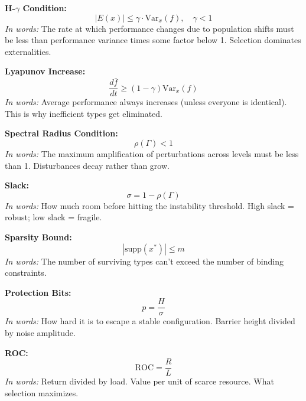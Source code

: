 \documentclass[12pt]{article}
\newcommand{\Var}{\mathrm{Var}}
\begin{document}
\textbf{H-$\gamma$ Condition:}
\[
|E(x)| \leq \gamma \cdot \Var_x(f), \quad \gamma < 1
\]
\emph{In words:} The rate at which performance changes due to population shifts must be less than performance variance times some factor below 1. Selection dominates externalities.

\textbf{Lyapunov Increase:}
\[
\frac{d\bar{f}}{dt} \geq (1 - \gamma) \Var_x(f)
\]
\emph{In words:} Average performance always increases (unless everyone is identical). This is why inefficient types get eliminated.

\textbf{Spectral Radius Condition:}
\[
\rho(\Gamma) < 1
\]
\emph{In words:} The maximum amplification of perturbations across levels must be less than 1. Disturbances decay rather than grow.

\textbf{Slack:}
\[
\sigma = 1 - \rho(\Gamma)
\]
\emph{In words:} How much room before hitting the instability threshold. High slack = robust; low slack = fragile.

\textbf{Sparsity Bound:}
\[
|\text{supp}(x^*)| \leq m
\]
\emph{In words:} The number of surviving types can't exceed the number of binding constraints.

\textbf{Protection Bits:}
\[
p = \frac{H}{\sigma}
\]
\emph{In words:} How hard it is to escape a stable configuration. Barrier height divided by noise amplitude.

\textbf{ROC:}
\[
\text{ROC} = \frac{R}{L}
\]
\emph{In words:} Return divided by load. Value per unit of scarce resource. What selection maximizes.
\end{document}
